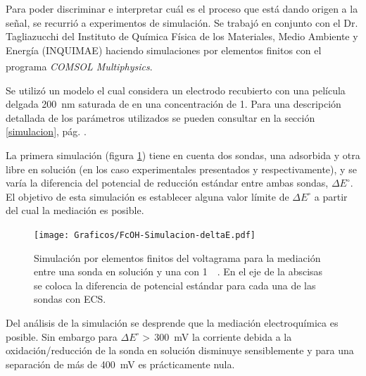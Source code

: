 		Para poder discriminar e interpretar cuál es el proceso que está dando origen a la señal, se recurrió a experimentos de simulación. Se trabajó en conjunto con el Dr. Tagliazucchi del Instituto de Química Física de los Materiales, Medio Ambiente y Energía (INQUIMAE) haciendo simulaciones por elementos finitos con el programa \textit{COMSOL Multiphysics\textsuperscript\textregistered}.

		Se utilizó un modelo el cual considera un electrodo recubierto con una película delgada \SI{200}{nm} saturada de  \aminorutenio en una concentración de \SI{1}{\Molar}. Para una descripción detallada de los parámetros utilizados se pueden consultar en la sección \ref{simulacion}, pág. \pageref{simulacion}. 

		La primera simulación (figura \ref{fig:sim_mediacion}) tiene en cuenta dos sondas, una adsorbida y otra libre en solución (en los caso experimentales presentados \ru\space y \fc\space respectivamente), y se varía la diferencia del potencial de reducción estándar entre ambas sondas, $\Delta E^\circ$. El objetivo de esta simulación es establecer alguna valor límite de $\Delta E^\circ$ a partir del cual la mediación es posible. 

			\begin{figure}[ht]
					\centering
					\vspace*{-2mm}
			 	    \texttt{[image: Graficos/FcOH-Simulacion-deltaE.pdf]}
			 	    \vspace*{-3mm}
			        \caption[Simulación EQ de mediación redox]{Simulación por elementos finitos del voltagrama para la mediación entre una sonda en solución y una \pdmF\space con \ru\space \SI{1}{\milli\Molar}. En el eje de la abscisas se coloca la diferencia de potencial estándar para cada una de las sondas con ECS.}
			        \label{fig:sim_mediacion}\vspace*{3mm}
			      	\end{figure}

		Del análisis de la simulación se desprende que la mediación electroquímica es posible. Sin embargo para $\Delta E^\circ\!\!>\,$\SI{300}{\milli\volt} la corriente debida a la oxidación/reducción de la sonda en solución disminuye sensiblemente y para una separación de más de \SI{400}{\milli\volt} es prácticamente nula. %

